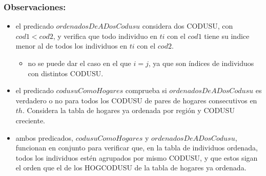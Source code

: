    \subsubsection{Observaciones:}
        \begin{itemize}
            \item el predicado $ordenadosDeADosCodusu$ considera dos CODUSU, con $cod1 < cod2$, y verifica que todo individuo en $ti$ con el $cod1$ tiene su indice menor al de
            todos los individuos en $ti$ con el $cod2$.
                \begin{itemize}
                    \item no se puede dar el caso en el que $i = j$, ya que son \'indices de individuos con distintos CODUSU.
                \end{itemize}
            \item el predicado $codusuComoHogares$ comprueba si $ordenadosDeADosCodusu$ es verdadero o no para todos los CODUSU de pares de hogares consecutivos en $th$.
            Considera la tabla de hogares ya ordenada por regi\'on y CODUSU creciente.
            \item ambos predicados, $codusuComoHogares$ y $ordenadosDeADosCodusu$, funcionan en conjunto para verificar que, en la tabla de individuos ordenada, todos los
            individuos est\'en agrupados por mismo CODUSU, y que estos sigan el orden que el de los HOGCODUSU de la tabla de hogares ya ordenada.
        \end{itemize}
